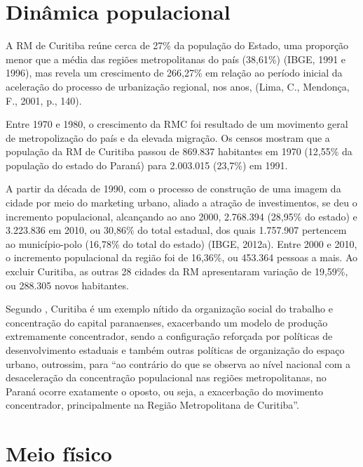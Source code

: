 	\section{Dinâmica populacional}
	
	A RM de Curitiba reúne cerca de 27\% da população do Estado,  uma proporção menor que a média das regiões metropolitanas do país (38,61\%) (IBGE, 1991 e 1996), mas revela um  crescimento de 266,27\% em relação ao período inicial da aceleração do processo de urbanização regional, nos anos, (Lima, C., Mendonça, F., 2001, p., 140).
	
	Entre 1970 e 1980, o crescimento da RMC foi resultado de um movimento geral de metropolização do país e da elevada migração. Os censos mostram que a população da RM de Curitiba passou de 869.837 habitantes em 1970 (12,55\% da população do estado do Paraná) para 2.003.015 (23,7\%) em 1991.
	
	A partir da década de 1990, com o processo de construção de uma imagem da cidade por meio do marketing urbano, aliado a atração de investimentos, se deu o incremento populacional, alcançando ao ano 2000, 2.768.394 (28,95\% do estado) e 3.223.836 em 2010, ou 30,86\% do total estadual, dos quais 1.757.907 pertencem ao município-polo (16,78\% do total do estado) (IBGE, 2012a). Entre 2000 e 2010, o incremento populacional da região foi de 16,36\%, ou 453.364 pessoas a mais. Ao excluir Curitiba, as outras 28 cidades da RM apresentaram variação de 19,59\%, ou 288.305 novos habitantes.
	
	Segundo , Curitiba é um exemplo nítido da organização social do trabalho e concentração do capital paranaenses, exacerbando um modelo de produção extremamente concentrador, sendo a configuração reforçada por políticas de desenvolvimento estaduais e também outras políticas de organização do espaço urbano, outrossim, para  ``ao contrário do que se observa ao nível nacional com a desaceleração da concentração populacional nas regiões metropolitanas, no Paraná ocorre exatamente o oposto, ou seja, a exacerbação do movimento concentrador, principalmente na Região Metropolitana de Curitiba''.	
	
	\section{Meio físico}
	
